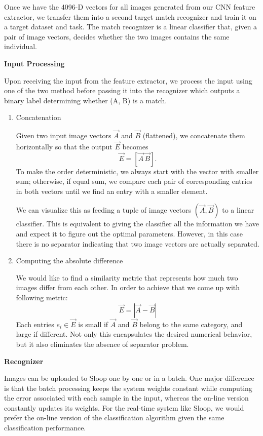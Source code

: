 Once we have the 4096-D vectors for all images generated from our CNN feature extractor, we transfer them into a second target match recognizer and train it on a target dataset and task. The match recognizer is a linear classifier that, given a pair of image vectors, decides whether the two images contains the same individual.

\textbf{Input Processing}

Upon receiving the input from the feature extractor, we process the input using one of the two method before passing it into the recognizer which outputs a binary label determining whether (A, B) is a match.

\begin{enumerate}
\item Concatenation

Given two input image vectors $\vec{A}$ and $\vec{B}$ (flattened), we concatenate them horizontally so that the output $\vec{E}$ becomes 
$$\vec{E} = [ \vec{A}\, \vec{B} ].$$
To make the order deterministic, we always start with the vector with smaller sum; otherwise, if equal sum, we compare each pair of corresponding entries in both vectors until we find an entry with a smaller element.

We can visualize this as feeding a tuple of image vectors $( \vec{A}, \vec{B} )$ to a linear classifier. This is equivalent to giving the classifier all the information we have and expect it to figure out the optimal parameters. However, in this case there is no separator indicating that two image vectors are actually separated.

\item Computing the absolute difference

We would like to find a similarity metric that represents how much two images differ from each other. In order to achieve that we come up with following metric:
$$\vec{E} = |\vec{A} - \vec{B}|$$  
Each entries $e_i \in \vec{E}$ is small if $\vec{A}$ and $\vec{B}$ belong to the same category, and large if different.
Not only this encapsulates the desired numerical behavior, but it also eliminates the absence of separator problem.
  
\end{enumerate}

\textbf{Recognizer}

Images can be uploaded to Sloop one by one or in a batch. One major difference is that the batch processing keeps the system weights constant while computing the error associated with each sample in the input, whereas the on-line version constantly updates its weights. For the real-time system like Sloop, we would prefer the on-line version of the classification algorithm given the same classification performance.


